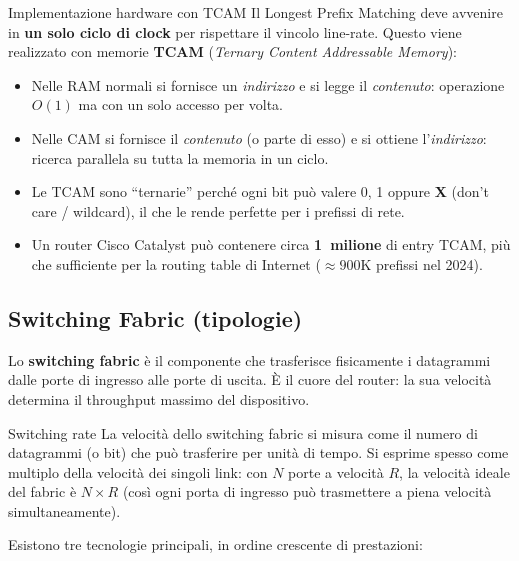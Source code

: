 \documentclass[a4paper,12pt]{report}
\begin{document}
\begin{notebox}{Implementazione hardware con TCAM}
Il Longest Prefix Matching deve avvenire in \textbf{un solo ciclo di clock}
per rispettare il vincolo line-rate. Questo viene realizzato con memorie
\textbf{TCAM} (\textit{Ternary Content Addressable Memory}):
\begin{itemize}
    \item Nelle RAM normali si fornisce un \textit{indirizzo} e si legge
          il \textit{contenuto}: operazione $O(1)$ ma con un solo accesso
          per volta.
    \item Nelle CAM si fornisce il \textit{contenuto} (o parte di esso) e
          si ottiene l'\textit{indirizzo}: ricerca parallela su tutta la
          memoria in un ciclo.
    \item Le TCAM sono ``ternarie'' perché ogni bit può valere 0, 1 oppure
          \textbf{X} (don't care / wildcard), il che le rende perfette per
          i prefissi di rete.
    \item Un router Cisco Catalyst può contenere circa \textbf{1~milione}
          di entry TCAM, più che sufficiente per la routing table di
          Internet ($\approx 900$K prefissi nel 2024).
\end{itemize}
\end{notebox}


\newpage
\subsection{Switching Fabric (tipologie)}

Lo \textbf{switching fabric} è il componente che trasferisce fisicamente i
datagrammi dalle porte di ingresso alle porte di uscita. È il cuore del
router: la sua velocità determina il throughput massimo del dispositivo.

\begin{defbox}{Switching rate}
La velocità dello switching fabric si misura come il numero di datagrammi
(o bit) che può trasferire per unità di tempo. Si esprime spesso come
multiplo della velocità dei singoli link: con $N$ porte a velocità $R$,
la velocità ideale del fabric è $N \times R$ (così ogni porta di ingresso
può trasmettere a piena velocità simultaneamente).
\end{defbox}

Esistono tre tecnologie principali, in ordine crescente di prestazioni:
\end{document}
